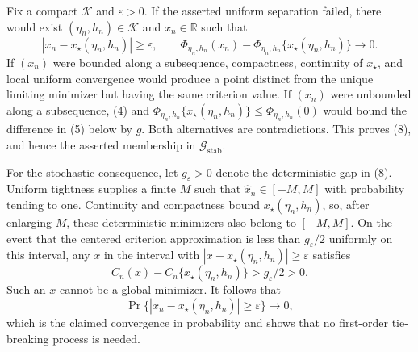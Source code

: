 Fix a compact \(\mathcal K\) and \(\varepsilon>0\).  If the asserted uniform separation failed, there would exist \((\eta_n,h_n)\in\mathcal K\) and \(x_n\in\mathbb R\) such that
\[
 |x_n-x_\star(\eta_n,h_n)|\geq\varepsilon,
 \qquad
 \Phi_{\eta_n,h_n}(x_n)-
 \Phi_{\eta_n,h_n}\{x_\star(\eta_n,h_n)\}\longrightarrow0. \tag{5}
\]
If \((x_n)\) were bounded along a subsequence, compactness, continuity of \(x_\star\), and local uniform convergence would produce a point distinct from the unique limiting minimizer but having the same criterion value.  If \((x_n)\) were unbounded along a subsequence, (4) and \(\Phi_{\eta_n,h_n}\{x_\star(\eta_n,h_n)\}\leq\Phi_{\eta_n,h_n}(0)\) would bound the difference in (5) below by \(g\).  Both alternatives are contradictions.  This proves (8), and hence the asserted membership in \(\mathcal G_{\mathrm{stab}}\).

For the stochastic consequence, let \(g_\varepsilon>0\) denote the deterministic gap in (8).  Uniform tightness supplies a finite \(M\) such that \(\widehat x_n\in[-M,M]\) with probability tending to one.  Continuity and compactness bound \(x_\star(\eta_n,h_n)\), so, after enlarging \(M\), these deterministic minimizers also belong to \([-M,M]\).  On the event that the centered criterion approximation is less than \(g_\varepsilon/2\) uniformly on this interval, any \(x\) in the interval with \(|x-x_\star(\eta_n,h_n)|\geq\varepsilon\) satisfies
\[
 C_n(x)-C_n\{x_\star(\eta_n,h_n)\}>g_\varepsilon/2>0.
\]
Such an \(x\) cannot be a global minimizer.  It follows that
\[
 \Pr\{|\widehat x_n-x_\star(\eta_n,h_n)|\geq\varepsilon\}\longrightarrow0,
\]
which is the claimed convergence in probability and shows that no first-order tie-breaking process is needed.

